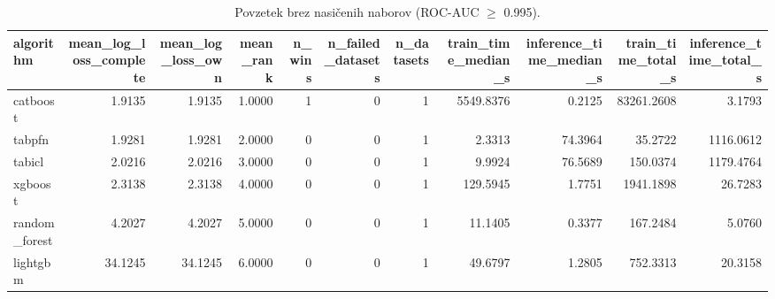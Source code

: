 \begin{table}[htbp]
\centering
\caption{Povzetek brez nasičenih naborov (ROC-AUC $\geq$ 0.995).}
\label{tab:overall-nonsat}
\begin{tabular}{lrrrrrrrrrr}
\hline
algorithm & mean\_log\_loss\_complete & mean\_log\_loss\_own & mean\_rank & n\_wins & n\_failed\_datasets & n\_datasets & train\_time\_median\_s & inference\_time\_median\_s & train\_time\_total\_s & inference\_time\_total\_s \\
\hline
catboost & 1.9135 & 1.9135 & 1.0000 & 1 & 0 & 1 & 5549.8376 & 0.2125 & 83261.2608 & 3.1793 \\
tabpfn & 1.9281 & 1.9281 & 2.0000 & 0 & 0 & 1 & 2.3313 & 74.3964 & 35.2722 & 1116.0612 \\
tabicl & 2.0216 & 2.0216 & 3.0000 & 0 & 0 & 1 & 9.9924 & 76.5689 & 150.0374 & 1179.4764 \\
xgboost & 2.3138 & 2.3138 & 4.0000 & 0 & 0 & 1 & 129.5945 & 1.7751 & 1941.1898 & 26.7283 \\
random\_forest & 4.2027 & 4.2027 & 5.0000 & 0 & 0 & 1 & 11.1405 & 0.3377 & 167.2484 & 5.0760 \\
lightgbm & 34.1245 & 34.1245 & 6.0000 & 0 & 0 & 1 & 49.6797 & 1.2805 & 752.3313 & 20.3158 \\
\hline
\end{tabular}
\end{table}
